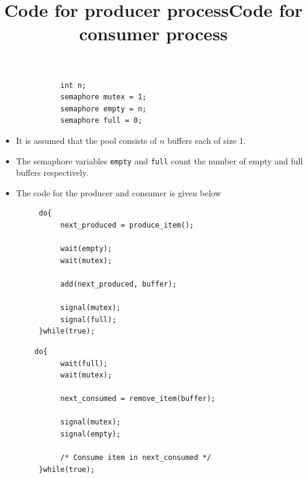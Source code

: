 \documentclass{article}
\theoremstyle{plain}
\theoremstyle{definition}
\begin{document}
\begin{figure}[!h]
    \begin{verbatim}
        int n;
        semaphore mutex = 1;
        semaphore empty = n;
        semaphore full = 0;
    \end{verbatim}
\end{figure}
\begin{itemize}
    \item It is assumed that the pool consists of $n$ buffers each of size 1. 
    
    \item The semaphore variables \texttt{empty} and \texttt{full} count the number of empty and full buffers respectively. 
    
    \item The code for the producer and consumer is given below
\end{itemize}
\begin{figure}[!ht]
 \begin{minipage}{0.5\textwidth}
  \centering
  \begin{verbatim}
   do{
        next_produced = produce_item();
        
        wait(empty);
        wait(mutex);
        
        add(next_produced, buffer);
        
        signal(mutex);
        signal(full);
   }while(true);
  \end{verbatim}
  \title{Code for producer process}
 \end{minipage}
 \begin{minipage}{0.5\textwidth}
  \centering
  \begin{verbatim}
  do{
        wait(full);
        wait(mutex);
        
        next_consumed = remove_item(buffer);
        
        signal(mutex);
        signal(empty);
        
        /* Consume item in next_consumed */
   }while(true);
  \end{verbatim}
  \title{Code for consumer process}
 \end{minipage}
\end{figure}
\end{document}
